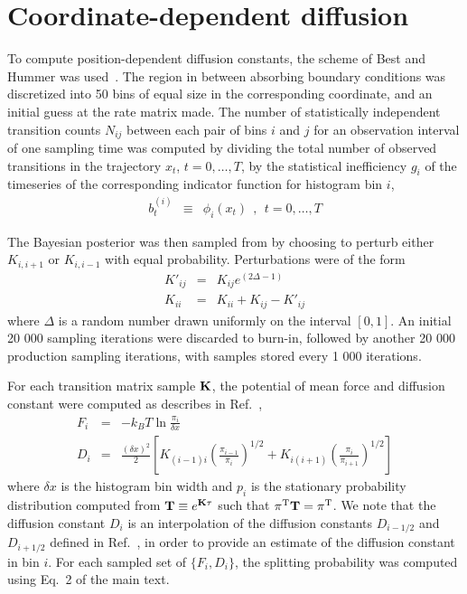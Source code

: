 \documentclass[aps,prl,twocolumn,superscriptaddress,floatfix]{revtex4-1}
\newcommand{\bfm}[1]{{\bf #1}}
\newcommand{\T}{\mathrm{T}}                                %
\begin{document}

\section{Coordinate-dependent diffusion}

To compute position-dependent diffusion constants, the scheme of Best and Hummer was used~\cite{best-hummer:2010:pnas:coordinate-dependent-diffusion}.
The region in between absorbing boundary conditions was discretized into 50 bins of equal size in the corresponding coordinate, and an initial guess at the rate matrix made.
The number of statistically independent transition counts $N_{ij}$ between each pair of bins $i$ and $j$ for an observation interval of one sampling time was computed by dividing the total number of observed transitions in the trajectory $x_t$, $t = 0,\ldots,T$, by the statistical inefficiency $g_i$ of the timeseries of the corresponding indicator function for histogram bin $i$,
\begin{eqnarray}
b^{(i)}_t &\equiv& \phi_i(x_t) \:\:,\:\: t = 0,\ldots,T
\end{eqnarray}

The Bayesian posterior was then sampled from by choosing to perturb either $K_{i,i+1}$ or $K_{i,i-1}$ with equal probability.
Perturbations were of the form
\begin{eqnarray}
K'_{ij} &=& K_{ij} e^{(2 \Delta - 1)} \nonumber \\
K_{ii} &=& K_{ii} + K_{ij} - K'_{ij}
\end{eqnarray}
where $\Delta$ is a random number drawn uniformly on the interval $[0,1]$.
An initial 20 000 sampling iterations were discarded to burn-in, followed by another 20 000 production sampling iterations, with samples stored every 1 000 iterations.

For each transition matrix sample $\bfm{K}$, the potential of mean force and diffusion constant were computed as describes in Ref.~\cite{best-hummer:2010:pnas:coordinate-dependent-diffusion},
\begin{eqnarray}
F_i &=& - k_B T \ln \frac{\pi_i}{\delta x}  \\
D_i &=& \frac{(\delta x)^2}{2} \left[ K_{(i-1)i} \left(\frac{\pi_{i-1}}{\pi_i}\right)^{1/2} +  K_{i(i+1)} \left(\frac{\pi_i}{\pi_{i+1}}\right)^{1/2} \right] \nonumber
\end{eqnarray}
where $\delta x$ is the histogram bin width and $p_i$ is the stationary probability distribution computed from $\bfm{T} \equiv e^{\bfm{K} \tau}$ such that $\pi^\T \bfm{T} = \pi^\T$.
We note that the diffusion constant $D_i$ is an interpolation of the diffusion constants $D_{i-1/2}$ and $D_{i+1/2}$ defined in Ref.~\cite{best-hummer:2010:pnas:coordinate-dependent-diffusion}, in order to provide an estimate of the diffusion constant in bin $i$.
For each sampled set of $\{F_i, D_i\}$, the splitting probability was computed using Eq.~2 of the main text.
\end{document}
